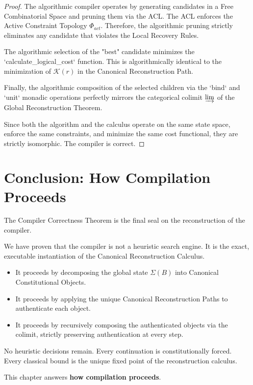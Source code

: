 \documentclass[12pt,openany]{extbook}
\theoremstyle{plain}
\theoremstyle{definition}
\begin{document}
\begin{proof}
The algorithmic compiler operates by generating candidates in a Free Combinatorial Space and pruning them via the ACL. The ACL enforces the Active Constraint Topology $\Phi_{act}$. Therefore, the algorithmic pruning strictly eliminates any candidate that violates the Local Recovery Rules. 

The algorithmic selection of the "best" candidate minimizes the `calculate\_logical\_cost` function. This is algorithmically identical to the minimization of $\mathcal{K}(r)$ in the Canonical Reconstruction Path. 

Finally, the algorithmic composition of the selected children via the `bind` and `unit` monadic operations perfectly mirrors the categorical colimit $\varinjlim$ of the Global Reconstruction Theorem. 

Since both the algorithm and the calculus operate on the same state space, enforce the same constraints, and minimize the same cost functional, they are strictly isomorphic. The compiler is correct.
\end{proof}

\section{Conclusion: How Compilation Proceeds}

The Compiler Correctness Theorem is the final seal on the reconstruction of the compiler. 

We have proven that the compiler is not a heuristic search engine. It is the exact, executable instantiation of the Canonical Reconstruction Calculus. 
\begin{itemize}
    \item It proceeds by decomposing the global state $\Sigma(B)$ into Canonical Constitutional Objects.
    \item It proceeds by applying the unique Canonical Reconstruction Paths to authenticate each object.
    \item It proceeds by recursively composing the authenticated objects via the colimit, strictly preserving authentication at every step.
\end{itemize}

No heuristic decisions remain. Every continuation is constitutionally forced. Every classical bound is the unique fixed point of the reconstruction calculus.

This chapter answers \textbf{how compilation proceeds}.
\end{document}
